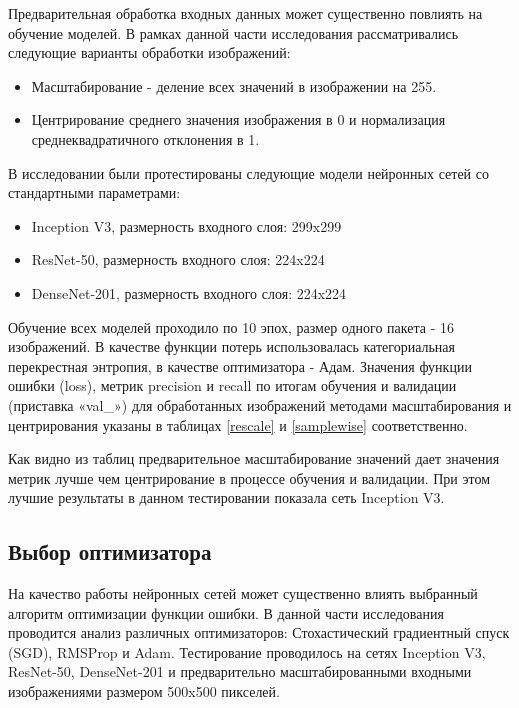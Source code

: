 Предварительная обработка входных данных может существенно повлиять на обучение моделей. В рамках данной части исследования рассматривались следующие варианты обработки изображений:
\begin{itemize}    
    \item Масштабирование - деление всех значений в изображении на 255.
    \item Центрирование среднего значения изображения в 0 и нормализация среднеквадратичного отклонения в 1.
\end{itemize}
В исследовании были протестированы следующие модели нейронных сетей со стандартными параметрами:
\begin{itemize}
    \item Inception V3, размерность входного слоя: 299x299
    \item ResNet-50, размерность входного слоя: 224x224
    \item DenseNet-201, размерность входного слоя:  224x224
\end{itemize} 
Обучение всех моделей проходило по 10 эпох, размер одного пакета - 16 изображений. В качестве функции потерь использовалась категориальная перекрестная энтропия, в качестве оптимизатора - Адам. 
Значения функции ошибки (loss), метрик precision и recall  по итогам обучения и валидации (приставка «val\_») для обработанных изображений методами масштабирования и центрирования указаны в таблицах \ref{rescale} и \ref{samplewise} соответственно. 



Как видно из таблиц предварительное масштабирование значений дает значения метрик лучше чем центрирование в процессе обучения и валидации. При этом лучшие результаты в данном тестировании показала сеть Inception V3.

\subsection{Выбор оптимизатора}
На качество работы нейронных сетей может существенно влиять выбранный алгоритм оптимизации функции ошибки. В данной части исследования проводится анализ различных оптимизаторов: Стохастический градиентный спуск (SGD), RMSProp и Adam. Тестирование проводилось на сетях Inception V3, ResNet-50, DenseNet-201 и предварительно масштабированными входными изображениями размером 500x500 пикселей.  


